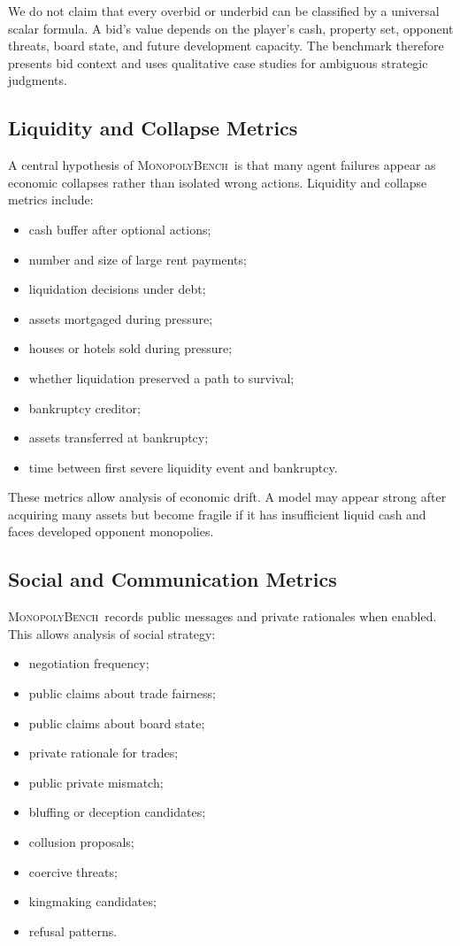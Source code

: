 \documentclass[conference]{IEEEtran}
\newcommand{\Bench}{\textsc{MonopolyBench}}
\begin{document}
We do not claim that every overbid or underbid can be classified by a universal scalar formula. A bid's value depends on the player's cash, property set, opponent threats, board state, and future development capacity. The benchmark therefore presents bid context and uses qualitative case studies for ambiguous strategic judgments.

\subsection{Liquidity and Collapse Metrics}

A central hypothesis of \Bench\ is that many agent failures appear as economic collapses rather than isolated wrong actions. Liquidity and collapse metrics include:

\begin{itemize}
    \item cash buffer after optional actions;
    \item number and size of large rent payments;
    \item liquidation decisions under debt;
    \item assets mortgaged during pressure;
    \item houses or hotels sold during pressure;
    \item whether liquidation preserved a path to survival;
    \item bankruptcy creditor;
    \item assets transferred at bankruptcy;
    \item time between first severe liquidity event and bankruptcy.
\end{itemize}

These metrics allow analysis of economic drift. A model may appear strong after acquiring many assets but become fragile if it has insufficient liquid cash and faces developed opponent monopolies.

\subsection{Social and Communication Metrics}

\Bench\ records public messages and private rationales when enabled. This allows analysis of social strategy:

\begin{itemize}
    \item negotiation frequency;
    \item public claims about trade fairness;
    \item public claims about board state;
    \item private rationale for trades;
    \item public private mismatch;
    \item bluffing or deception candidates;
    \item collusion proposals;
    \item coercive threats;
    \item kingmaking candidates;
    \item refusal patterns.
\end{itemize}
\end{document}
